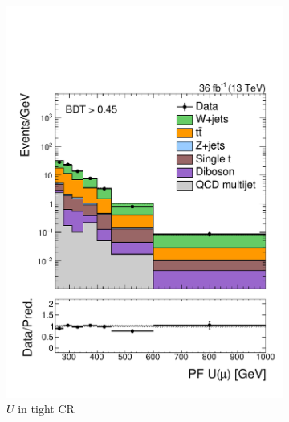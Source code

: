 \begin{figure}[]
\begin{center}
\begin{subfigure}[t]{0.32\textwidth}
            \includegraphics[width=\textwidth]{figures/monotop/prefit/singlemuonw_tight_pfUWmag_logy.pdf}
            \caption{$U$ in tight CR}
            \label{fig:mt:prefit_wmn:tight1}
        \end{subfigure}
        \begin{subfigure}[t]{0.32\textwidth}

\end{subfigure}
\end{center}
\end{figure}
